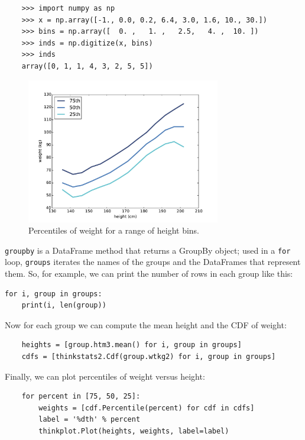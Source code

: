 \documentclass[12pt]{book}
\begin{document}
{\color{blue}
\begin{verbatim}
    >>> import numpy as np
    >>> x = np.array([-1., 0.0, 0.2, 6.4, 3.0, 1.6, 10., 30.])
    >>> bins = np.array([  0. ,   1. ,   2.5,   4. ,  10. ])
    >>> inds = np.digitize(x, bins)
    >>> inds
    array([0, 1, 1, 4, 3, 2, 5, 5])
\end{verbatim}
}

\begin{figure}
\centerline{\includegraphics[height=2.5in]{figs/scatter3.pdf}}
\caption{Percentiles of weight for a range of height bins.}
\label{scatter3}
\end{figure}

{\tt groupby} is a DataFrame method that returns a GroupBy object;
used in a {\tt for} loop, {\tt groups} iterates the names of the groups
and the DataFrames that represent them.  So, for example, we can
print the number of rows in each group like this:

\begin{verbatim}
for i, group in groups:
    print(i, len(group))
\end{verbatim}

Now for each group we can compute the mean height and the CDF
of weight:

\begin{verbatim}
    heights = [group.htm3.mean() for i, group in groups]
    cdfs = [thinkstats2.Cdf(group.wtkg2) for i, group in groups]
\end{verbatim}

Finally, we can
plot percentiles of weight versus height:

\begin{verbatim}
    for percent in [75, 50, 25]:
        weights = [cdf.Percentile(percent) for cdf in cdfs]
        label = '%dth' % percent
        thinkplot.Plot(heights, weights, label=label)
\end{verbatim}
\end{document}

